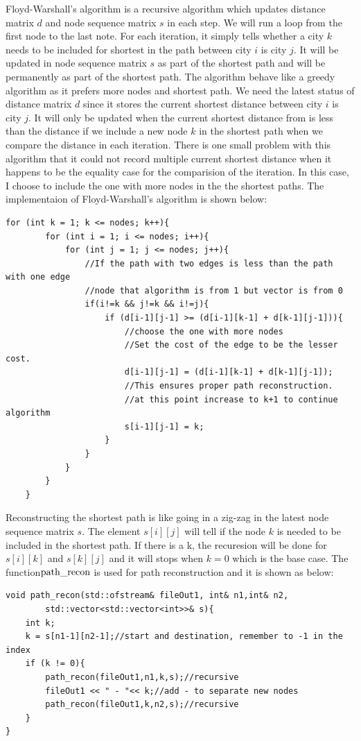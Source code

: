 \documentclass[a4paper,12pt]{article}%
\begin{document}
Floyd-Warshall's algorithm is a recursive algorithm which updates distance matrix $d$ and 
node sequence matrix $s$ in each step. We will run a loop from the first node to the last note. For each iteration, it simply tells whether a city $k$ needs to be included for shortest in the path between city $i$ is city $j$. It will be updated in node sequence matrix $s$ as part of the shortest path and will be permanently as part of the shortest path. The algorithm behave like a greedy algorithm as it prefers more nodes and shortest path. We need the latest status of distance matrix $d$ since it stores the current shortest distance between city $i$ is city $j$. It will only be updated when the current shortest distance from is less than the distance if we include a new node $k$ in the shortest path when we compare the distance in each iteration. There is one small problem with this algorithm that it could not record multiple current shortest distance when it happens to be the equality case for the comparision of the iteration. In this case, I choose to include the one with more nodes in the the shortest paths. The implementaion of Floyd-Warshall’s algorithm is shown below:
\begin{lstlisting}[title = $\lstinline{WFI}$]
	for (int k = 1; k <= nodes; k++){
        for (int i = 1; i <= nodes; i++){
            for (int j = 1; j <= nodes; j++){
                //If the path with two edges is less than the path with one edge
                //node that algorithm is from 1 but vector is from 0
                if(i!=k && j!=k && i!=j){ 
                    if (d[i-1][j-1] >= (d[i-1][k-1] + d[k-1][j-1])){
                        //choose the one with more nodes
                        //Set the cost of the edge to be the lesser cost.
                        d[i-1][j-1] = (d[i-1][k-1] + d[k-1][j-1]);
                        //This ensures proper path reconstruction. 
                        //at this point increase to k+1 to continue algorithm
                        s[i-1][j-1] = k;
                    }
                }
            }  	  
		}
    }        
\end{lstlisting}
Reconstructing the shortest path is like going in a zig-zag in the latest node sequence matrix $s$. The element $s[i][j]$ will tell if the node $k$ is needed to be included in the shortest path. If there is a k, the recuresion will be done for $s[i][k]$ and $s[k][j]$ and it will stops when $k=0$ which is the base case. The function$\lstinline{path_recon}$ is used for path reconstruction and it is shown as below:
\begin{lstlisting}[title = $\lstinline{path_recon}$]
void path_recon(std::ofstream& fileOut1, int& n1,int& n2, 
        std::vector<std::vector<int>>& s){
    int k;
    k = s[n1-1][n2-1];//start and destination, remember to -1 in the index
    if (k != 0){
        path_recon(fileOut1,n1,k,s);//recursive
        fileOut1 << " - "<< k;//add - to separate new nodes
        path_recon(fileOut1,k,n2,s);//recursive
    }
} 
\end{lstlisting}
\end{document}
